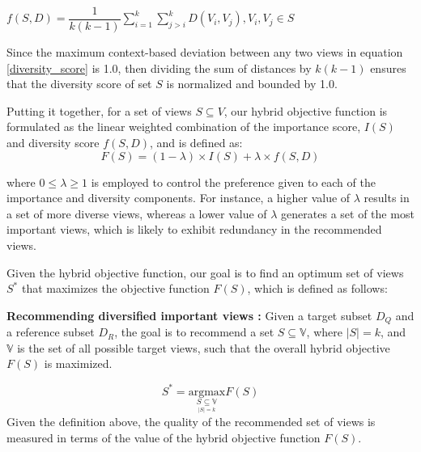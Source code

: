 $ f\left(S,D\right)= \dfrac{1}{k\left(k-1\right)}  \sum_{i=1}^{k} \sum_{j>i}^{k} D\left(V_i,V_j\right) ,V_i,V_j  \in S $

Since the maximum context-based deviation between any two views in equation \ref{diversity_score}  is 1.0, then dividing the sum of distances by $k\left(k-1\right)$ ensures that the diversity score of set $S$ is normalized and bounded by 1.0.

%
Putting it together, for a set of views $S \subseteq V$, our hybrid objective function is formulated as the linear weighted combination of the importance score, $ I\left(S\right) $ and diversity score $ f\left(S,D\right) $, and is defined as:
\begin{equation}
F\left(S\right) =  \left(1-\lambda\right) \times I\left(S\right) + \lambda \times f\left(S,D\right)
\label{objectif_function}
\end{equation}

where $ 0 \leq \lambda \geq 1 $ is employed to control the preference given to each of the importance and diversity components. 
%
For instance, a higher value of $  \lambda $ results in a set of more diverse views, whereas a lower value of $ \lambda $ generates a set of the most important views, which is likely to exhibit redundancy in the recommended views. 
%

Given the hybrid objective function, our goal is to find an optimum set of views  $ S^* $ that maximizes the objective function $ F\left(S\right) $, which is defined as follows:
\begin{definition} 
{\bf Recommending diversified important views :} Given a target subset $D_Q$  and a reference subset $D_R$, the goal is to recommend a set $S \subseteq \mathbb{V}$, where $|S| = k$, and $\mathbb{V}$ is the set of all possible target views, such that the overall hybrid objective $ F\left(S\right) $ is maximized. 
\end{definition} 


\begin{equation}
S^* = \underset{\underset{|S|=k} {S \subseteq \mathbb{V}}} {\mathrm{argmax}} F\left(S\right) 
\label{argmaxF}
\end{equation} 
Given the definition above, the quality of the recommended set of views is measured in terms of the value of the hybrid objective function $F\left(S\right)$.





